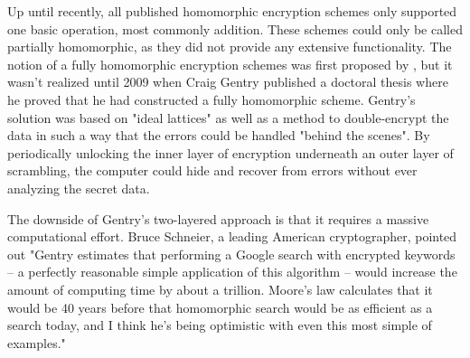 Up until recently, all published homomorphic encryption schemes only supported one basic operation, most commonly addition. These schemes could only be called partially homomorphic, as they did not provide any extensive functionality. The notion of a  fully homomorphic encryption schemes was first proposed by \cite{rivest1978data}, but it wasn't realized until 2009 when Craig Gentry published a doctoral thesis where he proved that he had constructed a fully homomorphic scheme\cite{gentry2009FHEpaper}. Gentry's solution was based on "ideal lattices" as well as a method to double-encrypt the data in such a way that the errors could be handled "behind the scenes". By periodically unlocking the inner layer of encryption underneath an outer layer of scrambling, the computer could hide and recover from errors without ever analyzing the secret data. 


The downside of Gentry's two-layered approach is that it requires a massive computational effort. Bruce Schneier, a leading American cryptographer, pointed out "Gentry estimates that performing a Google search with encrypted keywords -- a perfectly reasonable simple application of this algorithm -- would increase the amount of computing time by about a trillion. Moore's law calculates that it would be 40 years before that homomorphic search would be as efficient as a search today, and I think he's being optimistic with even this most simple of examples\citep{schneier2009blog}." 




\cleardoublepage
